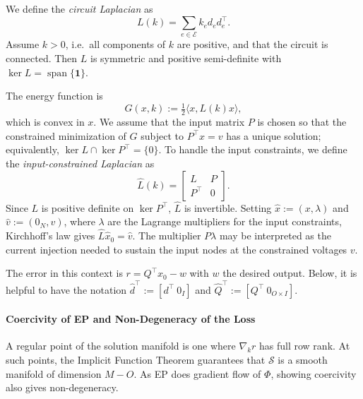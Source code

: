 \documentclass{siamart}
\begin{document}
We define the \textit{circuit Laplacian} as
\begin{equation}
   L(k)=\sum_{e \in \mathcal{E}}k_ed_{e}d_{e}^\top.
\end{equation}
Assume $k>0$, i.e.\ all components of $k$ are positive, and that the circuit is connected. Then $L$ is symmetric and positive semi-definite with $\ker L = \operatorname{span}\{\mathbf{1}\}$.

The energy function is
\begin{equation}
    G(x,k) := \tfrac{1}{2}\langle x, L(k)x\rangle,
\end{equation}
which is convex in $x$. We assume that the input matrix $P$ is chosen so that the constrained minimization of $G$ subject to $P^\top x = v$ has a unique solution; equivalently, $\ker L \cap \ker P^\top = \{0\}$. To handle the input constraints, we define the \textit{input-constrained Laplacian} as
\begin{equation}
    \hat{L}(k) = \begin{bmatrix}
        L & P \\ P^\top & 0
    \end{bmatrix}.
\end{equation}
Since $L$ is positive definite on $\ker P^\top$, $\hat{L}$ is invertible. Setting $\hat{x} :=(x,\lambda)$ and $\hat{v}:=(0_{N},v)$, where $\lambda$ are the Lagrange multipliers for the input constraints, Kirchhoff's law gives $\hat{L}\hat{x}_0 = \hat{v}$. The multiplier $P\lambda$ may be interpreted as the current injection needed to sustain the input nodes at the constrained voltages $v$.

The error in this context is $r= Q^\top x_0-w$ with $w$ the desired output. Below, it is helpful to have the notation $\hat{d}^\top :=[d^\top\ 0_{I}]$ and $\hat{Q}^\top := [Q^\top \ 0_{O\times I}]$.

\paragraph{Coercivity of EP and Non-Degeneracy of the Loss}
A regular point of the solution manifold is one where $\nabla_k r$ has full row rank. At such points, the Implicit Function Theorem guarantees that $\mathcal{S}$ is a smooth manifold of dimension $M-O$. As EP does gradient flow of $\Phi$, showing coercivity also gives non-degeneracy. 
\end{document}
